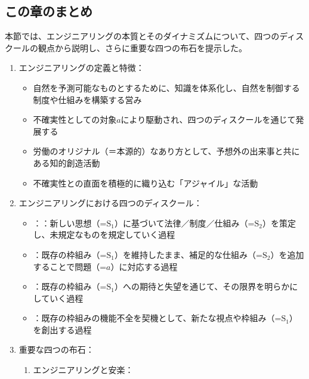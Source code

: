 \subsection{この章のまとめ}\label{ux3053ux306eux7ae0ux306eux307eux3068ux3081}

本節では、エンジニアリングの本質とそのダイナミズムについて、四つのディスクールの観点から説明し、さらに重要な四つの布石を提示した。

\begin{enumerate}
\def\labelenumi{\arabic{enumi}.}
\tightlist
\item
  エンジニアリングの定義と特徴：

  \begin{itemize}
  \tightlist
  \item
    自然を予測可能なものとするために、知識を体系化し、自然を制御する制度や仕組みを構築する営み
  \item
    不確実性としての対象\(a\)により駆動され、四つのディスクールを通じて発展する
  \item
    労働のオリジナル（＝本源的）なあり方として、予想外の出来事と共にある知的創造活動
  \item
    不確実性との直面を積極的に織り込む「アジャイル」な活動
  \end{itemize}
\item
  エンジニアリングにおける四つのディスクール：

  \begin{itemize}
  \tightlist
  \item
    ：：新しい思想（=\(\textrm{S}_1\)）に基づいて法律／制度／仕組み（=\(\textrm{S}_2\)）を策定し、未規定なものを規定していく過程
  \item
    ：既存の枠組み（=\(\textrm{S}_1\)）を維持したまま、補足的な仕組み（=\(\textrm{S}_2\)）を追加することで問題（=\(a\)）に対応する過程
  \item
    ：既存の枠組み（=\(\textrm{S}_1\)）への期待と失望を通じて、その限界を明らかにしていく過程
  \item
    ：既存の枠組みの機能不全を契機として、新たな視点や枠組み（=\(\textrm{S}_1\)）を創出する過程
  \end{itemize}
\item
  重要な四つの布石：

  \begin{enumerate}
  \def\labelenumii{\alph{enumii}.}
  \tightlist
  \item
    エンジニアリングと安楽：


\end{enumerate}
\end{enumerate}
